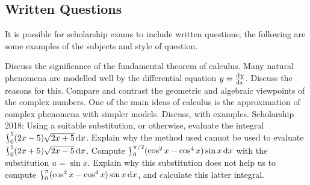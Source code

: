\documentclass{exam}
\DeclareMathOperator*{\rint}{\scalerel*{\rotatebox{17}{$\!\int\!$}}{\int}}
\begin{document}
\subsection*{Written Questions}
It is possible for scholarship exams to include written questions; the following are some examples of the subjects and style of question.
\begin{questions}
  \question Discuss the significance of the fundamental theorem of calculus.
  \question Many natural phenomena are modelled well by the differential equation $ y = \od{y}{x} $. Discuss the reasons for this.
  \question Compare and contrast the geometric and algebraic viewpoints of the complex numbers.
  \question One of the main ideas of calculus is the approximation of complex phenomena with simpler models. Discuss, with examples.
  \question Scholarship 2018: Using a suitable substitution, or otherwise, evaluate the integral $ \rint^5_0 (2x - 5)\sqrt{2x + 5} \dif{x} $.
            Explain why the method used cannot be used to evaluate $ \rint^5_0 (2x + 5)\sqrt{2x - 5} \dif{x} $.
  \question Compute $ \rint_0^{\pi/2} (\cos^2 x - \cos^4 x) \sin x \dif{x} $ with the substitution $ u = \sin x $. Explain why this substitution
            does not help us to compute $ \rint_0^{\pi} (\cos^2 x - \cos^4 x) \sin x \dif{x} $, and calculate this latter integral.
\end{questions}
\end{document}
